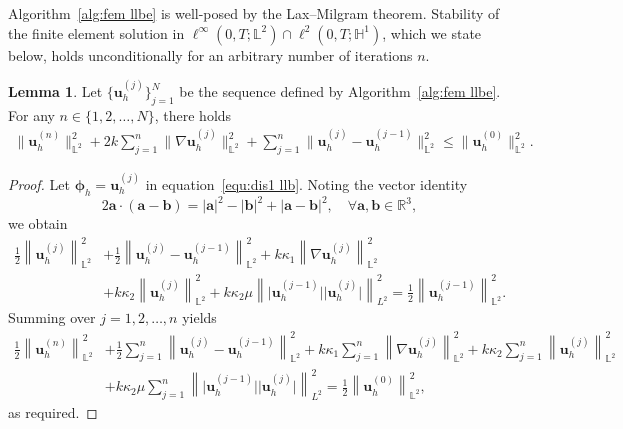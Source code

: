 \documentclass[11pt,reqno]{amsart}
\theoremstyle{definition}
\newtheorem{lemma}[theorem]{Lemma}
\numberwithin{equation}{section}
\newcommand{\bff}{\boldsymbol}
\newcommand{\bb}{\mathbb}
\newcommand{\nn}{\nonumber}
\newcommand{\norm}[2]{\left\|{#1}\right\|_{#2}}
\newcommand{\abs}[1]{\left|{#1}\right|}
\begin{document}
Algorithm~\ref{alg:fem llbe} is well-posed by the Lax--Milgram theorem. Stability of the finite element solution in $\ell^\infty(0,T;\bb{L}^2)\cap \ell^2(0,T;\bb{H}^1)$,
which we state below, holds unconditionally for an arbitrary number of iterations $n$.



\begin{lemma}\label{lem: stability2}
{Let $\big\{\bff{u}_h^{(j)}\big\}_{j=1}^N$ be the sequence defined by Algorithm~\ref{alg:fem llbe}.}	For any $n\in \{1,2,\ldots,N\}$, there holds
	\begin{align*}
		\|\bff{u}_h^{(n)}\|^2_{\bb{L}^2}
		+
		2k\sum_{j=1}^n\|\nabla\bff{u}_h^{(j)}\|^2_{\bb{L}^2}
		+
		\sum_{j=1}^n\|\bff{u}_h^{(j)}-\bff{u}_h^{(j-1)}\|^2_{\bb{L}^2}
		\leq 
		\|\bff{u}_h^{(0)}\|^2_{\bb{L}^2}.
	\end{align*}
\end{lemma}

\begin{proof}
Let $\bff{\phi}_h = \bff{u}_h^{(j)}$ in equation~\eqref{equ:dis1 llb}. Noting the vector identity
\begin{equation}\label{equ:vec ab a}
	2\bff{a}\cdot (\bff{a}-\bff{b})
	= 
	\abs{\bff{a}}^2-\abs{\bff{b}}^2
	+ \abs{\bff{a}-\bff{b}}^2, \quad \forall \bff{a},\bff{b}\in \bb{R}^3,
\end{equation} 
we obtain
\begin{align}\label{equ:uhj L2}
\frac12 \norm{\bff{u}_h^{(j)}}{\bb{L}^2}^2
&+
\frac12 \norm{\bff{u}_h^{(j)}-\bff{u}_h^{(j-1)}}{\bb{L}^2}^2
+
k\kappa_1 \norm{\nabla\bff{u}_h^{(j)}}{\bb{L}^2}^2
\nn \\
&+
k \kappa_2 \norm{\bff{u}_h^{(j)}}{\bb{L}^2}^2
+
k \kappa_2\mu \norm{\big|\bff{u}_h^{(j-1)}\big| \big|\bff{u}_h^{(j)}\big|}{L^2}^2
=
\frac12 \norm{\bff{u}_h^{(j-1)}}{\bb{L}^2}^2.
\end{align}
Summing over $j=1,2,\ldots,n$ yields
\begin{align*}
\frac12 \norm{\bff{u}_h^{(n)}}{\bb{L}^2}^2
&+
\frac12\sum_{j=1}^n \norm{\bff{u}_h^{(j)}-\bff{u}_h^{(j-1)}}{\bb{L}^2}^2
+
k\kappa_1 \sum_{j=1}^n \norm{\nabla\bff{u}_h^{(j)}}{\bb{L}^2}^2
+
k\kappa_2 \sum_{j=1}^n \norm{\bff{u}_h^{(j)}}{\bb{L}^2}^2
\\
&+
k\kappa_2\mu \sum_{j=1}^n \norm{\big|\bff{u}_h^{(j-1)}\big| \big|\bff{u}_h^{(j)}\big|}{L^2}^2
=
\frac12 \norm{\bff{u}_h^{(0)}}{\bb{L}^2}^2,
\end{align*}
as required.
\end{proof}
\end{document}
